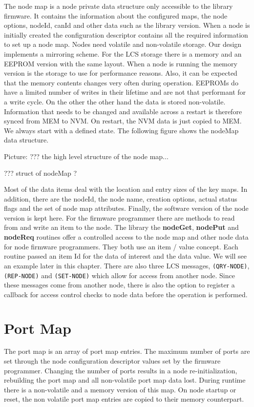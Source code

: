 The node map is a node private data structure only accessible to the library firmware. It contains the information about the configured maps, the node options, nodeId, canId and other data such as the library version. When a node is initially created the configuration descriptor contains all the required information to set up a node map. Nodes need volatile and non-volatile storage. Our design implements a mirroring scheme. For the LCS storage there is a memory and an EEPROM version with the same layout. When a node is running the memory version is the storage to use for performance reasons. Also, it can be expected that the memory contents changes very often during operation. EEPROMs do have a limited number of writes in their lifetime and are not that performant for a write cycle. On the other the other hand the data is stored non-volatile. Information that needs to be changed and available across a restart is therefore synced from MEM to NVM. On restart, the NVM data is just copied to MEM. We always start with a defined state. The following figure shows the nodeMap data structure.

Picture: ??? the high level structure of the node map...

??? struct of nodeMap ?

Most of the data items deal with the location and entry sizes of the key maps. In addition, there are the nodeId, the node name, creation options, actual status flags and the set of node map attributes. Finally, the software version of the node version is kept here. For the firmware programmer there are methods to read from and write an item to the node. The library the \textbf{nodeGet}, \textbf{nodePut} and \textbf{nodeReq} routines offer a controlled access to the node map and other node data for node firmware programmers. They both use an item / value concept. Each routine passed an item Id for the data of interest and the data value. We will see an example later in this chapter. There are also three LCS messages, \texttt{(QRY-NODE)}, \texttt{(REP-NODE)} and \texttt{(SET-NODE)} which allow for access from another node. Since these messages come from another node, there is also the option to register a callback for access control checks to node data before the operation is performed.

\section{Port Map}

The port map is an array of port map entries. The maximum number of ports are set through the node configuration descriptor values set by the firmware programmer. Changing the number of ports results in a node re-initialization, rebuilding the port map and all non-volatile port map data lost. During runtime there is a non-volatile and a memory version of this map. On node startup or reset, the non volatile port map entries are copied to their memory counterpart.

